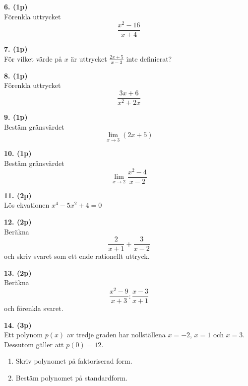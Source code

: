 \documentclass[12pt]{article}
\begin{document}
\vspace{0.5cm}

\noindent
\textbf{6. (1p)} \\
Förenkla uttrycket
\[
\frac{x^2 - 16}{x + 4}
\]

\vspace{0.5cm}

\noindent
\textbf{7. (1p)} \\
För vilket värde på $x$ är uttrycket $\frac{2x + 5}{x - 3}$ inte definierat?

\vspace{0.5cm}
\newpage
\noindent
\textbf{8. (1p)} \\
Förenkla uttrycket
\[
\frac{3x + 6}{x^2 + 2x}
\]

\vspace{0.5cm}

\noindent
\textbf{9. (1p)} \\
Bestäm gränsvärdet
\[
\lim_{x \to 3} (2x + 5)
\]

\vspace{0.5cm}

\noindent
\textbf{10. (1p)} \\
Bestäm gränsvärdet
\[
\lim_{x \to 2} \frac{x^2 - 4}{x - 2}
\]


\noindent
\textbf{11. (2p)} \\
Lös ekvationen $x^4 - 5x^2 + 4 = 0$

\vspace{0.5cm}

\noindent
\textbf{12. (2p)} \\
Beräkna
\[
\frac{2}{x + 1} + \frac{3}{x - 2}
\]
och skriv svaret som ett ende rationellt uttryck.

\vspace{0.5cm}

\noindent
\textbf{13. (2p)} \\
Beräkna
\[
\frac{x^2 - 9}{x + 3} : \frac{x - 3}{x + 1}
\]
och förenkla svaret.

\vspace{0.5cm}

\noindent
\textbf{14. (3p)} \\
Ett polynom $p(x)$ av tredje graden har nollställena $x = -2$, $x = 1$ och $x = 3$. Dessutom gäller att $p(0) = 12$.
\begin{enumerate}[label=\alph*)]
    \item Skriv polynomet på faktoriserad form.
    \item Bestäm polynomet på standardform.
\end{enumerate}
\end{document}
